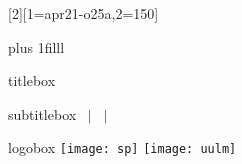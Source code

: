 [2][1=apr21-o25a,2=150]{
	{
	\usebackgroundtemplate{} %
	\begin{frame}[plain]
		\vskip0pt plus 1filll
		\begin{beamercolorbox}[wd=\paperwidth,ht=4.5ex,dp=2ex,right]{titlebox}
			\LARGE\textbf{\inserttitle}\hspace*{20pt}
		\end{beamercolorbox}%
		\nointerlineskip%
		\begin{beamercolorbox}[wd=\paperwidth,ht=2.25ex,dp=1ex,right]{subtitlebox}
			\small 
			\ifx \insertsubtitle \empty \else \insertsubtitle\ $\vert$ \fi
			\insertauthor\
			\ifx \insertdate \empty \else $\vert$ \insertdate \fi
			\hspace*{20pt}
		\end{beamercolorbox}%
		\nointerlineskip%
		\begin{beamercolorbox}[wd=\paperwidth,ht=4.5ex,dp=2ex,left]{logobox}
			\centering
			\vspace{-1ex}
			\hspace{10pt}
			\texttt{[image: sp]} %
			\hfill
			\texttt{[image: uulm]}
			\hspace{10pt}
		\end{beamercolorbox}%
	\end{frame}
	}  
}

\renewcommand{\emph}[1]{{\color{blue}\textbf{#1}}}

